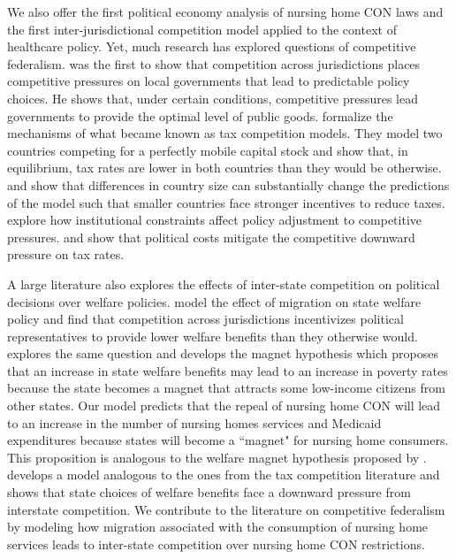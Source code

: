 \documentclass[../Main.tex]{subfiles}
\begin{document}
We also offer the first political economy analysis of nursing home CON laws and the first inter-jurisdictional competition model applied to the context of healthcare policy. Yet, much research has explored questions of competitive federalism. \citet{tiebout1956pure} was the first to show that competition across jurisdictions places competitive pressures on local governments that lead to predictable policy choices. He shows that, under certain conditions, competitive pressures lead governments to provide the optimal level of public goods. \citet{zodrow1986pigou} formalize the mechanisms of what became known as tax competition models. They model two countries competing for a perfectly mobile capital stock and show that, in equilibrium, tax rates are lower in both countries than they would be otherwise. \citet{bucovetsky1991asymmetric} and \citet{kanbur1993jeux} show that differences in country size can substantially change the predictions of the model such that smaller countries face stronger incentives to reduce taxes. \citet{genschel2002globalization} explore how institutional constraints affect policy adjustment to competitive pressures. \citet{basinger2004remodeling} and \citet{plumper2009there} show that political costs mitigate the competitive downward pressure on tax rates. 

A large literature also explores the effects of inter-state competition on political decisions over welfare policies. \citet{gramlich1984migration} model the effect of migration on state welfare policy and find that competition across jurisdictions incentivizes political representatives to provide lower welfare benefits than they otherwise would. \citet{peterson1989american} explores the same question and develops the magnet hypothesis which proposes that an increase in state welfare benefits may lead to an increase in poverty rates because the state becomes a magnet that attracts some low-income citizens from other states. Our model predicts that the repeal of nursing home CON will lead to an increase in the number of nursing homes services and Medicaid expenditures because states will become a ``magnet" for nursing home consumers. This proposition is analogous to the welfare magnet hypothesis proposed by \citet{peterson1989american}. \citet{saavedra2000model} develops a model analogous to the ones from the tax competition literature and shows that state choices of welfare benefits face a downward pressure from interstate competition. We contribute to the literature on competitive federalism by modeling how migration associated with the consumption of nursing home services leads to inter-state competition over nursing home CON restrictions. 
\end{document}
